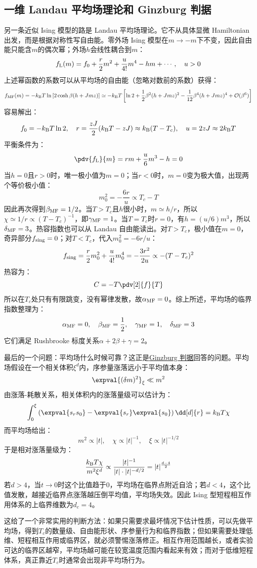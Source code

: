 \newpage
\subsection{一维 Landau 平均场理论和 Ginzburg 判据}
另一条近似 Ising 模型的路是 Landau 平均场理论。它不从具体显微 Hamiltonian 出发，而是根据对称性写自由能。零外场 Ising 模型在$m\to -m$下不变，因此自由能只能含$m$的偶次幂；外场$h$会线性耦合到$m$：
\[f_{\rm L}(m)=f_0+\frac{r}{2}m^2+\frac{u}{4!}m^4-hm+\cdots,\quad u>0\]
上述幂函数的系数可以从平均场的自由能（忽略对数前的系数）获得：
\[f_{\rm MF}(m)=-k_{\rm B}T\ln\left[2\cosh\beta(h+Jmz)\right]\simeq-k_{\rm B}T\left[\ln2+\frac{1}{2}\beta^2(h+Jmz)^2-\frac{1}{12}\beta^4(h+Jmz)^4+\mathcal{O}(\beta^6)\right]\]
容易解出：
\[f_0=-k_{\rm B}T\ln2, \quad r=\frac{zJ}{2}(k_{\rm B}T-zJ)\approx k_{\rm B}(T-T_c), \quad u=2zJ\approx2k_{\rm B}T\]
平衡条件为：
\[\pdv{f_{\rm L}}{m}=rm+\frac{u}{6}m^3-h=0\]
当$h=0$且$r>0$时，唯一极小值为$m=0$；当$r<0$时，$m=0$变为极大值，出现两个等价极小值：
\[m_0^2=-\frac{6r}{u}\propto T_c-T\]
因此再次得到$\beta_{\rm MF}=1/2$。当$T>T_c$且$h$很小时，$m\simeq h/r$，所以$\chi\simeq1/r\propto(T-T_c)^{-1}$，即$\gamma_{\rm MF}=1$。当$T=T_c$时$r=0$，有$h=(u/6)m^3$，所以$\delta_{\rm MF}=3$。热容指数也可以从 Landau 自由能读出。对$T>T_c$，极小值在$m=0$，奇异部分$f_{\rm sing}=0$；对$T<T_c$，代入$m_0^2=-6r/u$：
\[f_{\rm sing}=\frac{r}{2}m_0^2+\frac{u}{4!}m_0^4=-\frac{3r^2}{2u}\propto-(T-T_c)^2\]
热容为：
\[C=-T\pdv[2]{f}{T}\]
所以在$T_c$处只有有限跳变，没有幂律发散，故$\alpha_{\rm MF}=0$。综上所述，平均场的临界指数整理为：
\[\alpha_{\rm MF}=0,\quad \beta_{\rm MF}=\frac{1}{2},\quad \gamma_{\rm MF}=1,\quad \delta_{\rm MF}=3\]
它们满足 Rushbrooke 标度关系$\alpha+2\beta+\gamma=2$。

最后的一个问题：平均场什么时候可靠？这正是\href{https://en.wikipedia.org/wiki/Ginzburg_criterion}{Ginzburg 判据}回答的问题。平均场假设在一个相关体积$\xi^d$内，序参量涨落远小于平均值本身：
\[\expval{(\delta m)^2}_{\xi}\ll m^2\]
由涨落-耗散关系，相关体积内的涨落量级可以估计为：
\[\int_0^\xi\left(\expval{s_rs_0}-\expval{s_r}\expval{s_0}\right)\dd[d]{r}=k_{\rm B}T\chi\]
而平均场给出：
\[m^2\propto |t|,\quad \chi\propto |t|^{-1},\quad \xi\propto |t|^{-1/2}\]
于是相对涨落量级为：
\[\frac{k_{\rm B}T\chi}{m^2\xi^d}\propto\frac{|t|^{-1}}{|t|\cdot |t|^{-d/2}}=|t|^{\frac{d-4}{2}}\]
若$d>4$，当$t\to0$时这个比值趋于$0$，平均场在临界点附近自洽；若$d<4$，这个比值发散，越接近临界点涨落越压倒平均值，平均场失效。因此 Ising 型短程相互作用体系的上临界维数为$d_c=4$。

这给了一个非常实用的判断方法：如果只需要求最坏情况下估计性质，可以先做平均场，得到$T_c$的数量级、自由能形状、序参量行为和临界指数；但如果需要处理低维、短程相互作用或临界区，就必须警惕涨落修正。相互作用范围越长，或者实验可达的临界区越窄，平均场越可能在较宽温度范围内看起来有效；而对于低维短程体系，真正靠近$T_c$时通常会出现非平均场行为。
